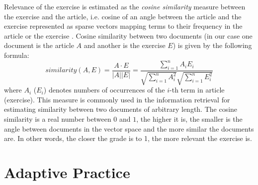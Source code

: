 \documentclass[12pt, twoside]{fithesis2}
\renewcommand{\_}{\leavevmode \kern0.07em\vbox{\hrule width0.4em}}
\begin{document}
Relevance of the exercise is estimated as the \textit{cosine similarity} measure between the exercise and the article,
i.e. cosine of an angle between the article and the exercise represented as sparse vectors mapping terms to their frequency in the article or the exercise
\cite[][121]{information-retrieval}.
Cosine similarity between two documents (in our case one document is the article $A$ and another is the exercise $E$) is given by the following formula:
\begin{equation}\label{eq:docs-similarity}
similarity(A, E)
= \frac{A \cdot E}{|A| |E|}
= \frac{\sum_{i=1}^{n} A_i E_i}{\sqrt{\sum_{i=1}^{n} A_i^2}\sqrt{\sum_{i=1}^{n} E_i^2}}
\end{equation}
where $A_i$ ($E_i$) denotes numbers of occurrences of the $i$-th term in article (exercise).
This measure is commonly used in the information retrieval for estimating similarity between two documents of arbitrary length. The cosine similarity is a real number between $0$ and $1$, the higher it is, the smaller is the angle between documents in the vector space and the more similar the documents are.
In other words, the closer the grade is to 1, the more relevant the exercise is.


\section{Adaptive Practice}
\label{sec:smartoo-practice}
\end{document}
